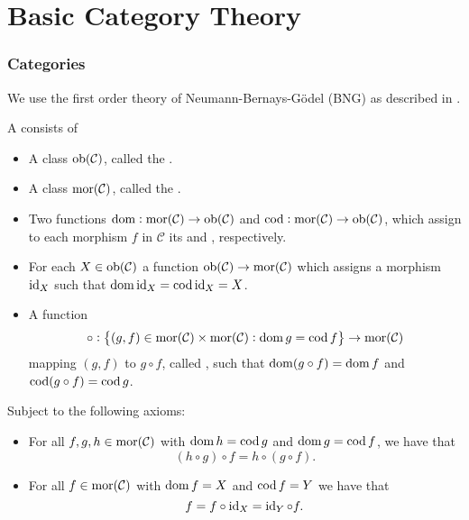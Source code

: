 \chapter{Basic Category Theory}
\subsection*{Categories}

We use the first order theory of Neumann-Bernays-G\"odel (BNG) as described in \cite[231]{mendelson:logic:2015}.

\begin{definition}[Category]
	A  consists of 
	\begin{itemize}[leftmargin = *]
		\item A class $\operatorname{ob}(\mathcal{C})$, called the .
		\item A class $\operatorname{mor}(\mathcal{C})$, called the .
		\item Two functions $\operatorname{dom} : \operatorname{mor}(\mathcal{C}) \to \operatorname{ob}(\mathcal{C})$ and $\operatorname{cod} : \operatorname{mor}(\mathcal{C}) \to \operatorname{ob}(\mathcal{C})$, which assign to each morphism $f$ in $\mathcal{C}$ its  and , respectively.
		\item For each $X \in \operatorname{ob}(\mathcal{C})$ a function $\operatorname{ob}(\mathcal{C}) \to \operatorname{mor}(\mathcal{C})$ which assigns a morphism $\operatorname{id}_X$ such that $\operatorname{dom} \operatorname{id}_X = \operatorname{cod} \operatorname{id}_X = X$.
		\item A function 
			\begin{equation}
				\circ : \cbr{(g,f) \in \mor(\mathcal{C}) \times \mor(\mathcal{C}) : \dom g = \cod f} \to \mor(\mathcal{C}) 
			\end{equation}
			mapping $(g,f)$ to $g \circ f$, called , such that $\operatorname{dom}(g \circ f) = \operatorname{dom} f$ and $\operatorname{cod}(g \circ f) = \operatorname{cod} g$.
	\end{itemize}
	Subject to the following axioms:
	\begin{itemize}[leftmargin = *]
		\item {} For all $f,g,h \in \operatorname{mor}(\mathcal{C})$ with $\operatorname{dom} h = \operatorname{cod} g$ and $\operatorname{dom} g = \operatorname{cod} f$, we have that
			\begin{equation}
				(h \circ g) \circ f = h \circ (g \circ f).
			\end{equation}
		\item {} For all $f \in \operatorname{mor}(\mathcal{C})$ with $\operatorname{dom} f = X$ and $\operatorname{cod} f = Y$ we have that
			\begin{equation}
				f = f \circ \operatorname{id}_X = \operatorname{id}_Y \circ f.
			\end{equation}
	\end{itemize}
\end{definition}

